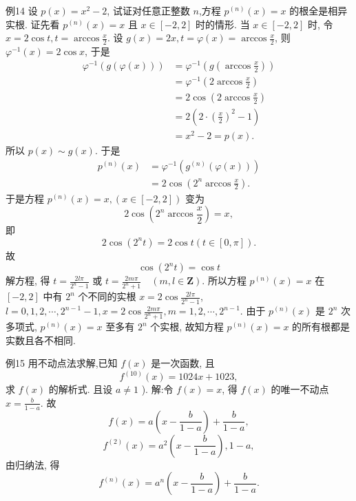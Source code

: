 例14 设 $p(x)=x^2-2$, 试证对任意正整数 $n$,方程 $p^{(n)}(x)=x$ 的根全是相异实根.
证先看 $p^{(n)}(x)=x$ 且 $x \in[-2,2]$ 时的情形.
当 $x \in[-2,2]$ 时, 令 $x=2 \cos t, t=\arccos \frac{x}{2}$. 设 $g(x)=2 x, t=\varphi(x)= \arccos \frac{x}{2}$, 则 $\varphi^{-1}(x)=2 \cos x$, 于是
$$
\begin{aligned}
\varphi^{-1}(g(\varphi(x))) & =\varphi^{-1}\left(g\left(\arccos \frac{x}{2}\right)\right) \\
& =\varphi^{-1}\left(2 \arccos \frac{x}{2}\right) \\
& =2 \cos \left(2 \arccos \frac{x}{2}\right) \\
& =2\left(2 \cdot\left(\frac{x}{2}\right)^2-1\right) \\
& =x^2-2=p(x) .
\end{aligned}
$$
所以 $p(x) \sim g(x)$. 于是
$$
\begin{aligned}
p^{(n)}(x) & =\varphi^{-1}\left(g^{(n)}(\varphi(x))\right) \\
& =2 \cos \left(2^n \arccos \frac{x}{2}\right) .
\end{aligned}
$$
于是方程 $p^{(n)}(x)=x,(x \in[-2,2])$ 变为
$$
2 \cos \left(2^n \arccos \frac{x}{2}\right)=x,
$$
即
$$
2 \cos \left(2^n t\right)=2 \cos t(t \in[0, \pi]) .
$$
故
$$
\cos \left(2^n t\right)=\cos t
$$
解方程, 得 $t=\frac{2 l \pi}{2^n-1}$ 或 $t=\frac{2 m \pi}{2^n+1} \quad(m, l \in \mathbf{Z})$.
所以方程 $p^{(n)}(x)=x$ 在 $[-2,2]$ 中有 $2^n$ 个不同的实根 $x=2 \cos \frac{2 l \pi}{2^n-1}$,
$l=0,1,2, \cdots, 2^{n-1}-1, x=2 \cos \frac{2 m \pi}{2^n+1}, m=1,2, \cdots, 2^{n-1}$.
由于 $p^{(n)}(x)$ 是 $2^n$ 次多项式, $p^{(n)}(x)=x$ 至多有 $2^n$ 个实根, 故知方程 $p^{(n)}(x)=x$ 的所有根都是实数且各不相同.



例15 用不动点法求解,已知 $f(x)$ 是一次函数, 且
$$
f^{(10)}(x)=1024 x+1023,
$$
求 $f(x)$ 的解析式.
且设 $a \neq 1$ ).
解:令 $f(x)=x$, 得 $f(x)$ 的唯一不动点 $x=\frac{b}{1-a}$.
故
$$
f(x)=a\left(x-\frac{b}{1-a}\right)+\frac{b}{1-a},
$$
$$
f^{(2)}(x)=a^2\left(x-\frac{b}{1-a}\right), 1-a,
$$
由归纳法, 得
$$
f^{(n)}(x)=a^n\left(x-\frac{b}{1-a}\right)+\frac{b}{1-a} .
$$



